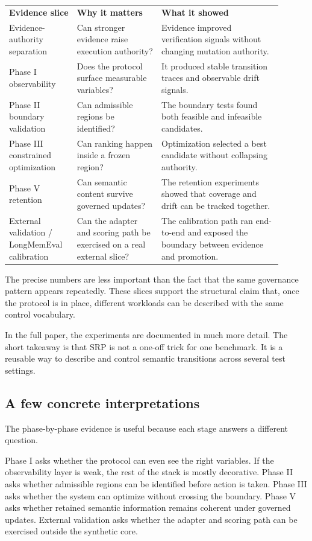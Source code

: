 \documentclass[10pt]{article}
\begin{document}
\begin{center}
\begin{tabular}{p{0.22\linewidth} p{0.28\linewidth} p{0.40\linewidth}}
\textbf{Evidence slice} & \textbf{Why it matters} & \textbf{What it showed} \\
Evidence-authority separation & Can stronger evidence raise execution authority? & Evidence improved verification signals without changing mutation authority. \\
Phase I observability & Does the protocol surface measurable variables? & It produced stable transition traces and observable drift signals. \\
Phase II boundary validation & Can admissible regions be identified? & The boundary tests found both feasible and infeasible candidates. \\
Phase III constrained optimization & Can ranking happen inside a frozen region? & Optimization selected a best candidate without collapsing authority. \\
Phase V retention & Can semantic content survive governed updates? & The retention experiments showed that coverage and drift can be tracked together. \\
External validation / LongMemEval calibration & Can the adapter and scoring path be exercised on a real external slice? & The calibration path ran end-to-end and exposed the boundary between evidence and promotion. \\
\end{tabular}
\end{center}

The precise numbers are less important than the fact that the same governance pattern appears repeatedly. These slices support the structural claim that, once the protocol is in place, different workloads can be described with the same control vocabulary.

In the full paper, the experiments are documented in much more detail. The short takeaway is that SRP is not a one-off trick for one benchmark. It is a reusable way to describe and control semantic transitions across several test settings.

\subsection*{A few concrete interpretations}
The phase-by-phase evidence is useful because each stage answers a different question.

Phase I asks whether the protocol can even see the right variables. If the observability layer is weak, the rest of the stack is mostly decorative. Phase II asks whether admissible regions can be identified before action is taken. Phase III asks whether the system can optimize without crossing the boundary. Phase V asks whether retained semantic information remains coherent under governed updates. External validation asks whether the adapter and scoring path can be exercised outside the synthetic core.
\end{document}
